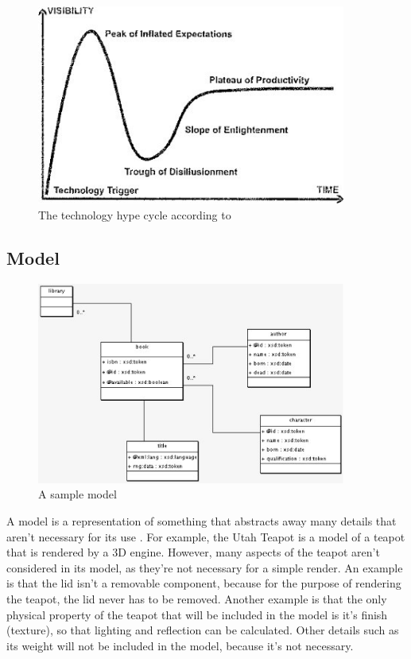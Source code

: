 \begin{figure}
\includegraphics[width=4in]{figures/mde_pos.jpg}
\caption{The technology hype cycle according to \citet{brambillaBook}}
\label{mde_pos}
\end{figure}

\subsection{Model}

\begin{figure}
\includegraphics[width=4in]{figures/sample_model.jpg}
\caption{A sample model}
\label{uml_sample}
\end{figure}

A model is a representation of something that abstracts away many details that aren't necessary for its use \citep{brambillaBook}. For example, the Utah Teapot \citep{utahTeapot} is a model of a teapot that is rendered by a 3D engine. However, many aspects of the teapot aren't considered in its model, as they're not necessary for a simple render. An example is that the lid isn't a removable component, because for the purpose of rendering the teapot, the lid never has to be removed. Another example is that the only physical property of the teapot that will be included in the model is it's finish (texture), so that lighting and reflection can be calculated. Other details such as its weight will not be included in the model, because it's not necessary.

